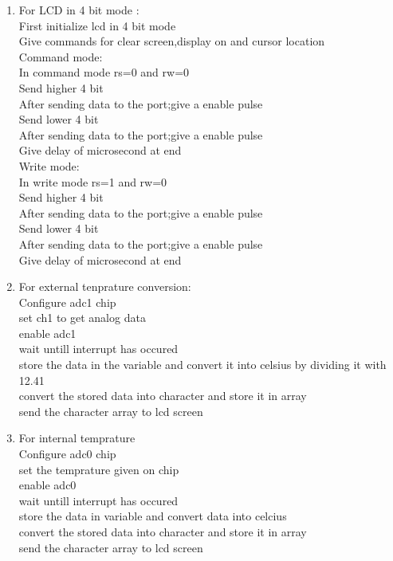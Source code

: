 \documentclass{article} %
\begin{document}
\begin{enumerate}
\item For LCD in 4 bit mode :\\
First initialize lcd in 4 bit mode\\
Give commands for clear screen,display on and cursor location\\
Command mode:\\
In command mode rs=0 and rw=0\\
Send higher 4 bit\\ 
After sending data to the port;give a enable pulse \\
Send lower 4 bit\\ 
After sending data to the port;give a enable pulse \\
Give delay of microsecond at end\\
Write mode:\\
In write mode rs=1 and rw=0\\
Send higher 4 bit\\ 
After sending data to the port;give a enable pulse \\
Send lower 4 bit\\ 
After sending data to the port;give a enable pulse \\
Give delay of microsecond at end\\
\item For external tenprature conversion:\\
Configure adc1 chip\\
set ch1 to get analog data\\
enable adc1 \\
wait untill interrupt has occured\\
store the data in the variable and convert it into celsius by dividing it with 12.41\\
convert the stored data into character and store it in array\\
send the character array to lcd screen\\
\item For internal temprature\\
Configure adc0 chip\\
set the temprature given on chip\\
enable adc0\\
wait untill interrupt has occured\\
store the data in variable and convert data into celcius\\
convert the stored data into character and store it in array\\
send the character array to lcd screen\\






\end{enumerate}
\end{document}
